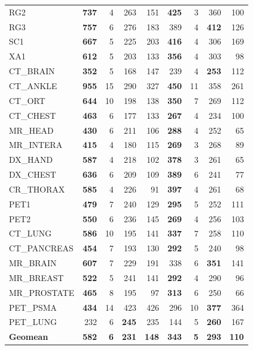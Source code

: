 \documentclass[journal]{IEEEtran}
\begin{document}
\begin{table}[htbp]
\begin{tabular}{l|rrrr|rrrr}
RG2            & \textbf{737} & 4 & 263 & 151 & \textbf{425} & 3 & 360 & 100 \\
RG3            & \textbf{757} & 6 & 276 & 183 & 389 & 4 & \textbf{412} & 126 \\
SC1            & \textbf{667} & 5 & 225 & 203 & \textbf{416} & 4 & 306 & 169 \\
XA1            & \textbf{612} & 5 & 203 & 133 & \textbf{356} & 4 & 303 & 98 \\
CT\_BRAIN      & \textbf{352} & 5 & 168 & 147 & 239 & 4 & \textbf{253} & 112 \\
CT\_ANKLE      & \textbf{955} & 15 & 290 & 327 & \textbf{450} & 11 & 358 & 261 \\
CT\_ORT        & \textbf{644} & 10 & 198 & 138 & \textbf{350} & 7 & 269 & 112 \\
CT\_CHEST      & \textbf{463} & 6 & 177 & 133 & \textbf{267} & 4 & 234 & 100 \\
MR\_HEAD       & \textbf{430} & 6 & 211 & 106 & \textbf{288} & 4 & 252 & 65 \\
MR\_INTERA     & \textbf{415} & 4 & 180 & 115 & \textbf{269} & 3 & 268 & 89 \\
DX\_HAND       & \textbf{587} & 4 & 218 & 102 & \textbf{378} & 3 & 261 & 65 \\
DX\_CHEST      & \textbf{636} & 6 & 209 & 109 & \textbf{389} & 6 & 241 & 77 \\
CR\_THORAX     & \textbf{585} & 4 & 226 & 91 & \textbf{397} & 4 & 261 & 68 \\
PET1           & \textbf{479} & 7 & 240 & 129 & \textbf{295} & 5 & 252 & 111 \\
PET2           & \textbf{550} & 6 & 236 & 145 & \textbf{269} & 4 & 256 & 103 \\
CT\_LUNG       & \textbf{586} & 10 & 195 & 141 & \textbf{337} & 7 & 258 & 110 \\
CT\_PANCREAS   & \textbf{454} & 7 & 193 & 130 & \textbf{292} & 5 & 240 & 98 \\
MR\_BRAIN      & \textbf{607} & 7 & 229 & 191 & 338 & 6 & \textbf{351} & 141 \\
MR\_BREAST     & \textbf{522} & 5 & 241 & 141 & \textbf{292} & 4 & 290 & 96 \\
MR\_PROSTATE   & \textbf{465} & 8 & 195 & 97 & \textbf{313} & 6 & 250 & 66 \\
PET\_PSMA      & \textbf{434} & 14 & 423 & 426 & 296 & 10 & \textbf{377} & 364 \\
PET\_LUNG      & 232 & 6 & \textbf{245} & 235 & 144 & 5 & \textbf{260} & 167 \\
\midrule
\textbf{Geomean} & \textbf{582} & \textbf{6} & \textbf{231} & \textbf{148} & \textbf{343} & \textbf{5} & \textbf{293} & \textbf{110} \\
\bottomrule
\end{tabular}
\end{table}
\end{document}
